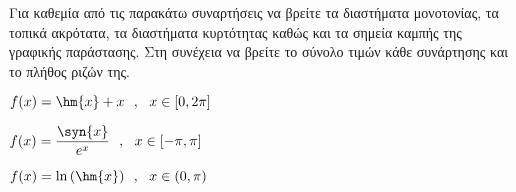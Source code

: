 Για καθεμία από τις παρακάτω συναρτήσεις να βρείτε τα διαστήματα μονοτονίας, τα τοπικά ακρότατα, τα διαστήματα κυρτότητας καθώς και τα σημεία καμπής της γραφικής παράστασης. Στη συνέχεια να βρείτε το σύνολο τιμών κάθε συνάρτησης και το πλήθος ριζών της.
\begin{alist}
\item $ f(x)=\hm{x}+x\ \ ,\ \ x\in[0,2\pi] $
\item $ f(x)=\dfrac{\syn{x}}{e^x}\ \ ,\ \ x\in[-\pi,\pi] $
\item $ f(x)=\ln{\left(\hm{x}\right)}\ \ ,\ \ x\in(0,\pi) $
\end{alist}
